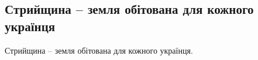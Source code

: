  
 
 
 
 
\subsection{Стрийщина – земля обітована для кожного українця}

Стрийщина – земля обітована для кожного українця. 

